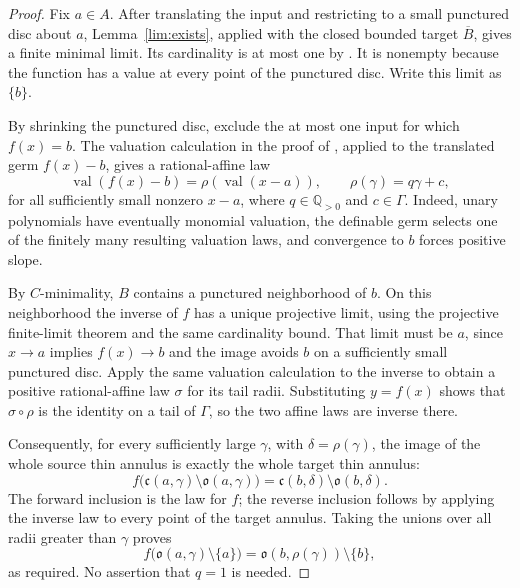 \documentclass[12pt]{amsart}
\theoremstyle{plain}
\theoremstyle{definition}
\theoremstyle{remark}
\numberwithin{equation}{section}
\theoremstyle{plain}
\newcommand{\gc}{\mathfrak{c}}
\newcommand{\go}{\mathfrak{o}}
\newcommand{\0}{\emptyset}
\DeclareMathOperator{\vv}{val}
\begin{document}
\begin{proof}
Fix $a\in A$. After translating the input and restricting to a small punctured disc about $a$, Lemma~\ref{lim:exists}, applied with the closed bounded target $\overline B$, gives a finite minimal limit. Its cardinality is at most one by \cite[Lemma~9.4]{Yin:special:trans}. It is nonempty because the function has a value at every point of the punctured disc. Write this limit as $\{b\}$.

By shrinking the punctured disc, exclude the at most one input for which $f(x)=b$. The valuation calculation in the proof of \cite[Lemma~8.3]{Yin:special:trans}, applied to the translated germ $f(x)-b$, gives a rational-affine law
\[
\vv(f(x)-b)=\rho(\vv(x-a)),\qquad \rho(\gamma)=q\gamma+c,
\]
for all sufficiently small nonzero $x-a$, where $q\in\mathbb Q_{>0}$ and $c\in\Gamma$. Indeed, unary polynomials have eventually monomial valuation, the definable germ selects one of the finitely many resulting valuation laws, and convergence to $b$ forces positive slope.

By $C$-minimality, $B$ contains a punctured neighborhood of $b$. On this neighborhood the inverse of $f$ has a unique projective limit, using the projective finite-limit theorem and the same cardinality bound. That limit must be $a$, since $x\to a$ implies $f(x)\to b$ and the image avoids $b$ on a sufficiently small punctured disc. Apply the same valuation calculation to the inverse to obtain a positive rational-affine law $\sigma$ for its tail radii. Substituting $y=f(x)$ shows that $\sigma\circ\rho$ is the identity on a tail of $\Gamma$, so the two affine laws are inverse there.

Consequently, for every sufficiently large $\gamma$, with $\delta=\rho(\gamma)$, the image of the whole source thin annulus is exactly the whole target thin annulus:
\[
f\bigl(\gc(a,\gamma)\setminus\go(a,\gamma)\bigr)
 =\gc(b,\delta)\setminus\go(b,\delta).
\]
The forward inclusion is the law for $f$; the reverse inclusion follows by applying the inverse law to every point of the target annulus. Taking the unions over all radii greater than $\gamma$ proves
\[
f\bigl(\go(a,\gamma)\setminus\{a\}\bigr)
 =\go(b,\rho(\gamma))\setminus\{b\},
\]
as required. No assertion that $q=1$ is needed.
\end{proof}
\end{document}
